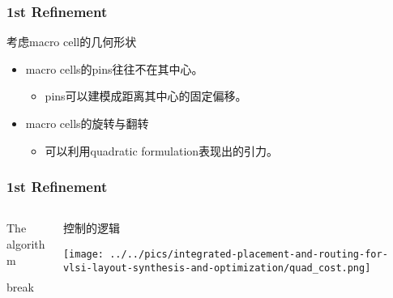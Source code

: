 \documentclass[UTF8,lualatex]{ctexbeamer}
\begin{document}
\begin{frame}
    \frametitle{1st Refinement}

    \begin{block}{考虑macro cell的几何形状}
        \begin{itemize}
            \item macro cells的pins往往不在其中心。
                \begin{itemize}
                    \item pins可以建模成距离其中心的固定偏移。
                \end{itemize}
            \item macro cells的旋转与翻转
                \begin{itemize}
                    \item 可以利用quadratic formulation表现出的引力。
                \end{itemize}
        \end{itemize}
    \end{block}
\end{frame}

\begin{frame}
    \frametitle{1st Refinement}

    \begin{columns}
        \begin{column}{0.47\textwidth}
            \begin{exampleblock}{The algorithm}
                \footnotesize
                \begin{algorithmic}[1]
                    \Loop
                        \State {}
                        \State {}
                        \State {}
                            \State {}
                            \State break
                        \Else
                            \State {}
                        \EndIf
                    \EndLoop
                \end{algorithmic}
            \end{exampleblock}
        \end{column}
        \begin{column}{0.47\textwidth}
            \begin{block}{控制的逻辑}
                \begin{center}
                    \texttt{[image: ../../pics/integrated-placement-and-routing-for-vlsi-layout-synthesis-and-optimization/quad\_cost.png]}
                \end{center}
            \end{block}
        \end{column}
    \end{columns}
\end{frame}
\end{document}
